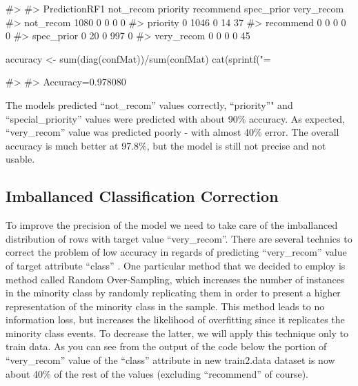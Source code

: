 \begin{Schunk}
\begin{Soutput}
#>              
#> PredictionRF1 not_recom priority recommend spec_prior very_recom
#>    not_recom       1080        0         0          0          0
#>    priority           0     1046         0         14         37
#>    recommend          0        0         0          0          0
#>    spec_prior         0       20         0        997          0
#>    very_recom         0        0         0          0         45
\end{Soutput}
\begin{Sinput}
accuracy <- sum(diag(confMat))/sum(confMat)
cat(sprintf("\nAccuracy=%f", accuracy))
\end{Sinput}
\begin{Soutput}
#> 
#> Accuracy=0.978080
\end{Soutput}
\end{Schunk}

The models predicted ``not\_recom'' values correctly, ``priority''" and
``special\_priority'' values were predicted with about 90\% accuracy. As
expected, ``very\_recom'' value was predicted poorly - with almost 40\%
error. The overall accuracy is much better at 97.8\%, but the model is
still not precise and not usable.

\newpage

\hypertarget{imballanced-classification-correction}{%
\subsection{Imballanced Classification
Correction}\label{imballanced-classification-correction}}

To improve the precision of the model we need to take care of the
imballanced distribution of rows with target value ``very\_recom''.
There are several technics to correct the problem of low accuracy in
regards of predicting ``very\_recom'' value of target attribute
``class'' \citep{noauthor_how_2017}. One particular method that we
decided to employ is method called Random Over-Sampling, which increases
the number of instances in the minority class by randomly replicating
them in order to present a higher representation of the minority class
in the sample. This method leads to no information loss, but increases
the likelihood of overfitting since it replicates the minority class
events. To decrease the latter, we will apply this technique only to
train data. As you can see from the output of the code below the portion
of ``very\_recom'' value of the ``class'' attribute in new train2.data
dataset is now about 40\% of the rest of the values (excluding
``recommend'' of course).

